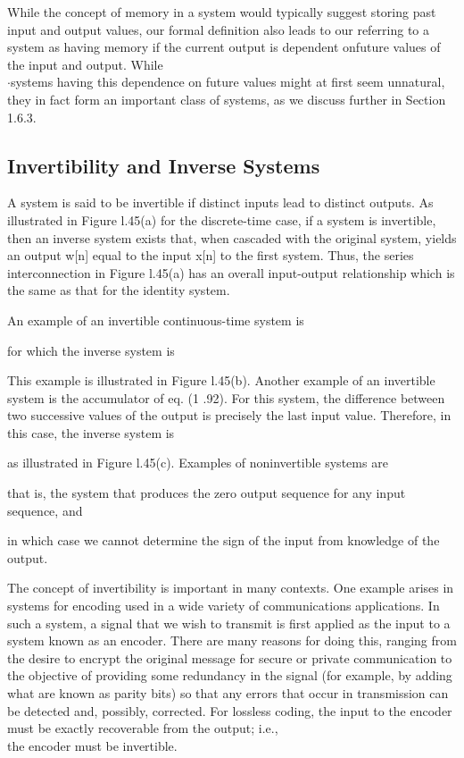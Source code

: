 \documentclass{report}
\begin{document}
While the concept of memory in a system would typically suggest storing past input and output values, our formal definition also leads to our referring
to a system as having memory if the current output is dependent onfuture values of the input and output. While\\
$\cdot $systems having this dependence on future values might at first seem unnatural, they in fact form an important class of systems, as we discuss
further in Section 1.6.3.

\subsection*{Invertibility and Inverse Systems}

A system is said to be invertible if distinct inputs lead to distinct outputs. As illustrated in Figure l.45(a) for the discrete-time case, if a
system is invertible, then an inverse system exists that, when cascaded with the original system, yields an output w[n] equal to the input x[n] to
the first system. Thus, the series interconnection in Figure l.45(a) has an overall input-output relationship which is the same as that for the identity
system.

An example of an invertible continuous-time system is



for which the inverse system is

This example is illustrated in Figure l.45(b). Another example of an invertible system is the accumulator of eq. (1 .92). For this system, the difference
between two successive values of the output is precisely the last input value. Therefore, in this case, the inverse system is



as illustrated in Figure l.45(c). Examples of noninvertible systems are



that is, the system that produces the zero output sequence for any input sequence, and



in which case we cannot determine the sign of the input from knowledge of the output. 

The concept of invertibility is important in many contexts. One example arises in systems for encoding used in a wide variety of communications applications.
In such a system, a signal that we wish to transmit is first applied as the input to a system known as an encoder. There are many reasons for doing
this, ranging from the desire to encrypt the original message for secure or private communication to the objective of providing some redundancy in
the signal (for example, by adding what are known as parity bits) so that any errors that occur in transmission can be detected and, possibly, corrected.
For lossless coding, the input to the encoder must be exactly recoverable from the output; i.e.,\\
the encoder must be invertible.
\end{document}

